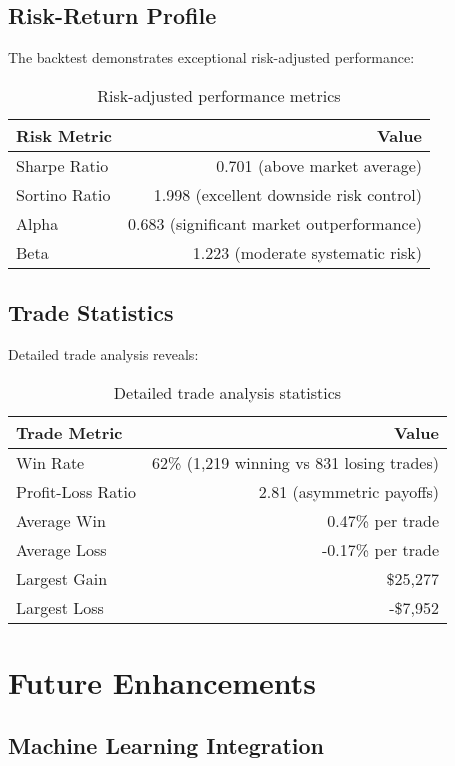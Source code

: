 \documentclass[onecolumn,11pt]{IEEEtran}
\begin{document}
\subsection{Risk-Return Profile}

The backtest demonstrates exceptional risk-adjusted performance:

\begin{table}[h]
\centering
\begin{tabular}{lr}
\toprule
\textbf{Risk Metric} & \textbf{Value} \\
\midrule
Sharpe Ratio & 0.701 (above market average) \\
Sortino Ratio & 1.998 (excellent downside risk control) \\
Alpha & 0.683 (significant market outperformance) \\
Beta & 1.223 (moderate systematic risk) \\
\bottomrule
\end{tabular}
\caption{Risk-adjusted performance metrics}
\end{table}

\subsection{Trade Statistics}

Detailed trade analysis reveals:

\begin{table}[h]
\centering
\begin{tabular}{lr}
\toprule
\textbf{Trade Metric} & \textbf{Value} \\
\midrule
Win Rate & 62\% (1,219 winning vs 831 losing trades) \\
Profit-Loss Ratio & 2.81 (asymmetric payoffs) \\
Average Win & 0.47\% per trade \\
Average Loss & -0.17\% per trade \\
Largest Gain & \$25,277 \\
Largest Loss & -\$7,952 \\
\bottomrule
\end{tabular}
\caption{Detailed trade analysis statistics}
\end{table}

\section{Future Enhancements}

\subsection{Machine Learning Integration}
\end{document}

